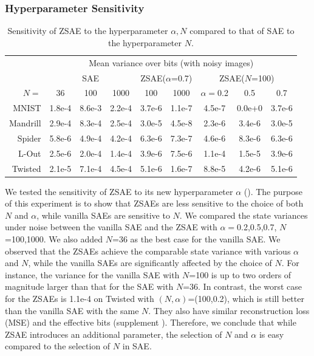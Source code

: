 \subsubsection{Hyperparameter Sensitivity}

\begin{table}[htb]
 \centering
 \begin{adjustbox}{width={\linewidth},keepaspectratio}
 \begin{tabular}{|r|*{8}{c|}}
     & \multicolumn{8}{c|}{Mean variance over bits (with noisy images)} \\
     & \multicolumn{3}{c|}{SAE} 
     & \multicolumn{2}{c|}{ZSAE($\alpha$=0.7)} 
     & \multicolumn{3}{c|}{ZSAE($N$=100)}
  \\
$N=$      &36     & 100    & 1000   & 100    & 1000   & $\alpha=$0.2 & 0.5    & 0.7    \\
MNIST     &1.8e-4 & 8.6e-3 & 2.2e-4 & 3.7e-6 & 1.1e-7 & 4.5e-7       & 0.0e+0 & 3.7e-6 \\
Mandrill  &2.9e-4 & 8.3e-4 & 2.5e-4 & 3.0e-5 & 4.5e-8 & 2.3e-6       & 3.4e-6 & 3.0e-5 \\
Spider    &5.8e-6 & 4.9e-4 & 4.2e-4 & 6.3e-6 & 7.3e-7 & 4.6e-6       & 8.3e-6 & 6.3e-6 \\
L-Out     &2.5e-6 & 2.0e-4 & 1.4e-4 & 3.9e-6 & 7.5e-6 & 1.1e-4       & 1.5e-5 & 3.9e-6 \\
Twisted   &2.1e-5 & 7.1e-4 & 4.5e-4 & 5.1e-6 & 1.6e-7 & 8.8e-5       & 4.2e-6 & 5.1e-6 \\
\end{tabular}
\end{adjustbox}
 \caption{Sensitivity of ZSAE to the hyperparameter $\alpha,N$ compared to that of SAE to the hyperparameter $N$.}
 \label{sensitivity}
\end{table}

We tested the sensitivity of ZSAE to its new hyperparameter $\alpha$ ().
The purpose of this experiment is to show that ZSAEs are less sensitive to the choice of both $N$ and $\alpha$,
while vanilla SAEs are sensitive to $N$.
% 
We compared the state variances under noise
between the vanilla SAE and the ZSAE with $\alpha=$0.2,0.5,0.7, $N$=100,1000.
We also added $N$=36 as the best case for the vanilla SAE.
% 
We observed that the ZSAEs achieve the comparable state variance with various $\alpha$ and $N$,
while the vanilla SAEs are significantly affected by the choice of $N$.
For instance,
the variance for the vanilla SAE with $N$=100 is up to two orders of magnitude larger than that for the SAE with $N$=36.
In contrast,
the worst case for the ZSAEs is 1.1e-4 on Twisted with $(N,\alpha)$=(100,0.2),
which is still better than the vanilla SAE with the same $N$.
% 
They also have similar reconstruction loss (MSE) and the effective bits (supplement ).
Therefore, we conclude that while ZSAE introduces an additional parameter,
the selection of $N$ and $\alpha$ is easy compared to the selection of $N$ in SAE.

